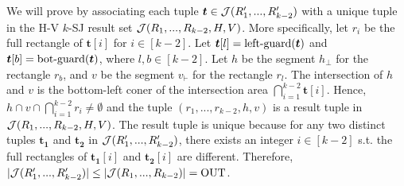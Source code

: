 
 We will prove by associating each tuple $\textrm{\boldmath${t}$} \in \mathcal{J}(R_1',...,R_{k-2}')$ with a unique tuple in the H-V $k$-SJ result set $\mathcal{J}(R_1,...,R_{k-2},H,V)$. More specifically, let $r_i$ be the full rectangle of $\bm{t}[i]$ for $i\in[k-2]$. Let $\textrm{\boldmath${t}$}[l] = \mathrm{left\text{-}guard}(\textrm{\boldmath${t}$})$ and $\textrm{\boldmath${t}$}[b] = \mathrm{bot\text{-}guard}(\textrm{\boldmath${t}$})$, where $l,b\in[k-2]$. Let $h$ be the segment $h_\bot$ for the rectangle $r_b$, and $v$ be the segment $v_\vdash$ for the rectangle $r_l$. The intersection of $h$ and $v$ is the bottom-left coner of the intersection area $\bigcap_{i = 1}^{k-2}\bm{t}[i]$. Hence, $h\cap v\cap \bigcap_{i = 1}^{k-2}r_i \neq \emptyset$ and the tuple $(r_1,...,r_{k-2},h,v)$ is a result tuple in $\mathcal{J}(R_1,...,R_{k-2},H,V)$. The result tuple is unique because for any two distinct tuples $\bm{t_1}$ and $\bm{t_2}$ in $\mathcal{J}(R_1',...,R_{k-2}')$, there exists an integer $i \in [k-2]$ s.t. the full rectangles of $\bm{t_1}[i]$ and $\bm{t_2}[i]$ are different. Therefore, $|\mathcal{J}(R_1',...,R_{k-2}')| \leq |\mathcal{J}(R_1,...,R_{k-2})| = \mathrm{OUT}$.

